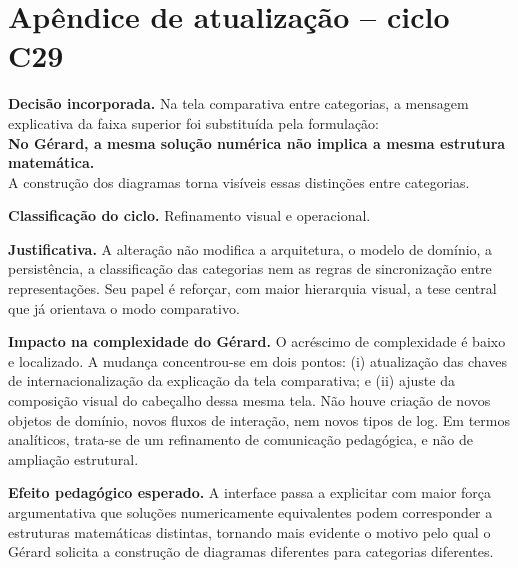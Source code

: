 \documentclass[12pt]{article}
\begin{document}
\section*{Apêndice de atualização -- ciclo C29}
\textbf{Decisão incorporada.} Na tela comparativa entre categorias, a mensagem explicativa da faixa superior foi substituída pela formulação:\\

{\large\bfseries No Gérard, a mesma solução numérica não implica a mesma estrutura matemática.}\\
{\large A construção dos diagramas torna visíveis essas distinções entre categorias.}

\textbf{Classificação do ciclo.} Refinamento visual e operacional.

\textbf{Justificativa.} A alteração não modifica a arquitetura, o modelo de domínio, a persistência, a classificação das categorias nem as regras de sincronização entre representações. Seu papel é reforçar, com maior hierarquia visual, a tese central que já orientava o modo comparativo.

\textbf{Impacto na complexidade do Gérard.} O acréscimo de complexidade é baixo e localizado. A mudança concentrou-se em dois pontos: (i) atualização das chaves de internacionalização da explicação da tela comparativa; e (ii) ajuste da composição visual do cabeçalho dessa mesma tela. Não houve criação de novos objetos de domínio, novos fluxos de interação, nem novos tipos de log. Em termos analíticos, trata-se de um refinamento de comunicação pedagógica, e não de ampliação estrutural.

\textbf{Efeito pedagógico esperado.} A interface passa a explicitar com maior força argumentativa que soluções numericamente equivalentes podem corresponder a estruturas matemáticas distintas, tornando mais evidente o motivo pelo qual o Gérard solicita a construção de diagramas diferentes para categorias diferentes.
\end{document}
